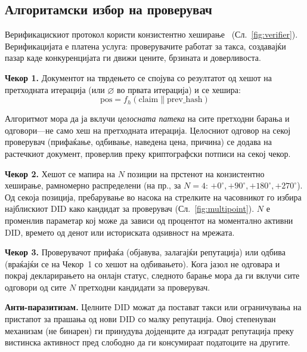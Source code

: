 \documentclass[11pt,a4paper,twocolumn]{article}
\begin{document}
\subsection{Алгоритамски избор на проверувач}

Верификацискиот протокол користи конзистентно хеширање~\cite{karger1997} (Сл.~\ref{fig:verifier}). Верификацијата е платена услуга: проверувачите работат за такса, создавајќи пазар каде конкуренцијата ги движи цените, брзината и доверливоста.

\textbf{Чекор 1.} Документот на тврдењето се спојува со резултатот од хешот на претходната итерација (или $\varnothing$ во првата итерација) и се хешира:
\begin{equation}
\text{pos} = f_h(\text{claim} \| \text{prev\_hash})
\label{eq:hash}
\end{equation}

Алгоритмот мора да ја вклучи \emph{целосната патека} на сите претходни барања и одговори---не само хеш на претходната итерација. Целосниот одговор на секој проверувач (прифаќање, одбивање, наведена цена, причина) се додава на растечкиот документ, проверлив преку криптографски потписи на секој чекор.

\textbf{Чекор 2.} Хешот се мапира на $N$ позиции на прстенот на конзистентно хеширање, рамномерно распределени (на пр., за $N=4$: $+0^{\circ}, +90^{\circ}, +180^{\circ}, +270^{\circ}$). Од секоја позиција, пребарување во насока на стрелките на часовникот го избира најблискиот DID како кандидат за проверувач (Сл.~\ref{fig:multipoint}). $N$ е променлив параметар кој може да зависи од процентот на моментално активни DID, времето од денот или историската одѕивност на мрежата.

\textbf{Чекор 3.} Проверувачот прифаќа (објавува, залагајќи репутација) или одбива (враќајќи се на Чекор~1 со хешот на одбивањето). Кога јазол не одговара и покрај декларирањето на онлајн статус, следното барање мора да ги вклучи сите одговори од сите $N$ претходни кандидати за проверувач.

\textbf{Анти-паразитизам.} Целните DID можат да постават такси или ограничувања на пристапот за прашања од нови DID со малку репутација. Овој степенуван механизам (не бинарен) ги принудува дојденците да изградат репутација преку вистинска активност пред слободно да ги консумираат податоците на другите.
\end{document}

